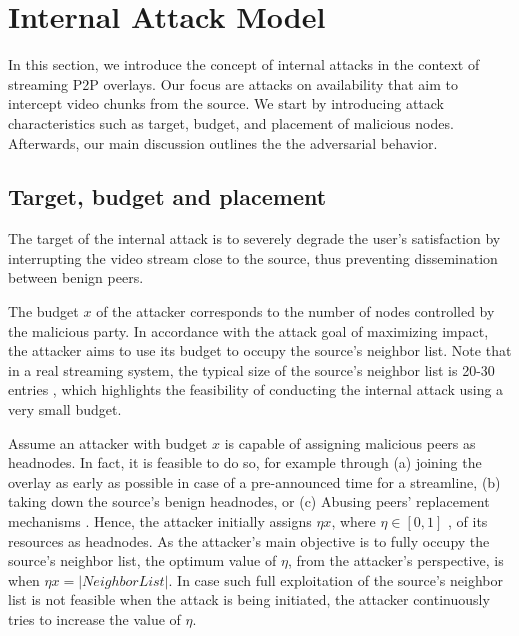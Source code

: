 \section{Internal Attack Model}
\label{sec:Attack}

In this section, we introduce the concept of internal attacks in the context of streaming P2P overlays.
Our focus are attacks on availability that aim to intercept video chunks from the source. 
We start by introducing attack characteristics such as target, budget, and placement of malicious nodes. 
Afterwards, our main discussion outlines the the \drop adversarial behavior. 

\subsection{Target, budget and placement}


The target of the internal attack is to severely degrade the user's satisfaction by interrupting the video stream close to the source, thus preventing dissemination between benign peers.

The budget $x$ of the attacker corresponds to the number of nodes controlled by the malicious party. 
In accordance with the attack goal of maximizing impact, the attacker aims to use its budget to occupy the source's neighbor list. 
Note that in a real streaming system, the typical size of the source's neighbor list is 20-30 entries \cite{neighborlist1,neighborlist2}, which highlights the feasibility of conducting the internal attack using a very small budget.

Assume an attacker with budget $x$ is capable of assigning malicious peers as headnodes.
In fact, it is feasible to do so, for example through (a) joining the overlay as early as possible in case of a pre-announced time for a streamline, (b) taking down the source's benign headnodes, or (c) Abusing peers' replacement mechanisms \cite{nguyen2016swap}.
Hence, the attacker initially assigns $\eta x$, where $\eta\in [0,1]$ , of its resources as headnodes.
As the attacker's main objective is to fully occupy the source's neighbor list, the optimum value of $\eta$, from the attacker's perspective, is when $\eta x = |NeighborList|$.
In case such full exploitation of the source's neighbor list is not feasible when the attack is being initiated, the attacker continuously tries to increase the value of $\eta$.  

